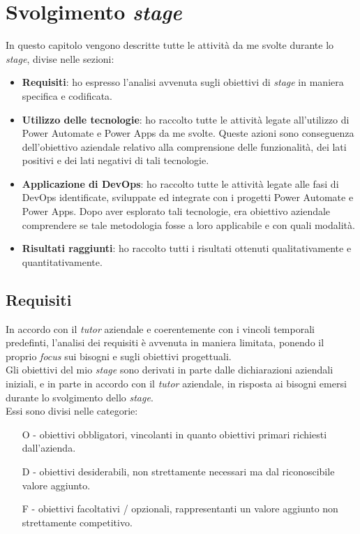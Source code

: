 \chapter{Svolgimento \emph{stage}}
\label{cap:svolgimentoStage}
In questo capitolo vengono descritte tutte le attività da me svolte durante lo \emph{stage}, divise nelle sezioni:
\begin{itemize}
	\item \textbf{Requisiti}: ho espresso l'analisi avvenuta sugli obiettivi di \emph{stage} in maniera specifica e codificata.
    \item \textbf{Utilizzo delle tecnologie}: ho raccolto tutte le attività legate all'utilizzo di Power Automate e Power Apps da me svolte. Queste azioni sono conseguenza dell'obiettivo aziendale relativo alla comprensione delle funzionalità, dei lati positivi e dei lati negativi di tali tecnologie.
    \item \textbf{Applicazione di DevOps}: ho raccolto tutte le attività legate alle fasi di DevOps identificate, sviluppate ed integrate con i progetti Power Automate e Power Apps. Dopo aver esplorato tali tecnologie, era obiettivo aziendale comprendere se tale metodologia fosse a loro applicabile e con quali modalità.
    \item \textbf{Risultati raggiunti}:  ho raccolto tutti i risultati ottenuti qualitativamente e quantitativamente.
\end{itemize}

\section{Requisiti}%
In accordo con il \emph{tutor} aziendale e coerentemente con i vincoli temporali predefinti, l'analisi dei requisiti è avvenuta in maniera limitata, ponendo il proprio \emph{focus} sui bisogni e sugli obiettivi progettuali.\\
Gli obiettivi del mio \emph{stage} sono derivati in parte dalle dichiarazioni aziendali iniziali, e in parte in accordo con il \emph{tutor} aziendale, in risposta ai bisogni emersi durante lo svolgimento dello \emph{stage}.\\
Essi sono divisi nelle categorie:
\begin{enumerate}
	\item[O -]obiettivi obbligatori, vincolanti in quanto obiettivi primari richiesti dall'azienda.
    \item[D -]obiettivi desiderabili, non strettamente necessari ma dal riconoscibile valore aggiunto.
    \item[F -]obiettivi facoltativi / opzionali, rappresentanti un valore aggiunto non strettamente competitivo.
\end{enumerate}

